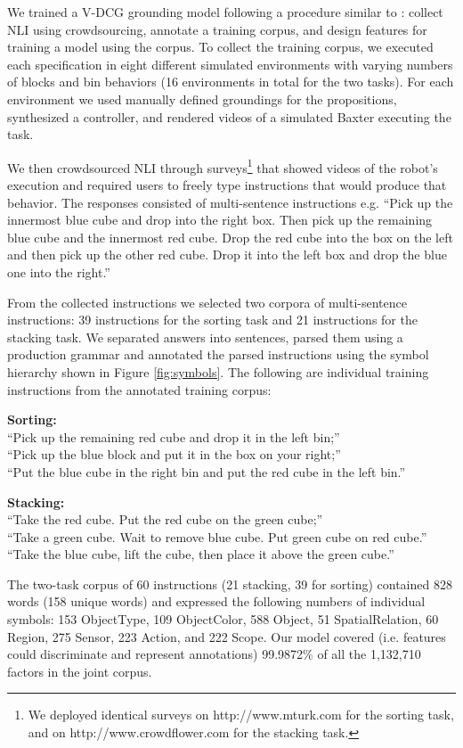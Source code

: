 \documentclass[letterpaper]{article} %
\begin{document}
We trained a V-DCG grounding model following a procedure similar to \cite{boteanu2016model}: collect NLI using crowdsourcing, annotate a training corpus, and design features for training a model using the corpus.
To collect the training corpus, we executed each specification in eight different simulated environments with varying numbers of blocks and bin behaviors (16 environments in total for the two tasks). For each environment we used manually defined groundings for the propositions, synthesized a controller, and rendered videos of a simulated Baxter executing the task.

We then crowdsourced NLI through surveys\footnote{We deployed identical surveys on http://www.mturk.com for the sorting task, and on http://www.crowdflower.com for the stacking task.}  that showed videos of the robot's execution and required users to freely type instructions that would produce that behavior. The responses consisted of multi-sentence instructions e.g. ``Pick up the innermost blue cube and drop into the right box. Then pick up the remaining blue cube and the innermost red cube. Drop the red cube into the box on the left and then pick up the other red cube. Drop it into the left box and drop the blue one into the right.''

From the collected instructions we selected two corpora of multi-sentence instructions: 39 instructions for the sorting task and 21 instructions for the stacking task.
We separated answers into sentences, parsed them using a production grammar and annotated the parsed instructions using the symbol hierarchy shown in Figure \ref{fig:symbols}.
The following are individual training instructions from the annotated training corpus:

\textbf{Sorting:}\\
``Pick up the remaining red cube and drop it in the left bin;''\\
``Pick up the blue block and put it in the box on your right;''\\
``Put the blue cube in the right bin and put the red cube in the left bin.''

\textbf{Stacking:}\\
``Take the red cube. Put the red cube on the green cube;''\\
``Take a green cube. Wait to remove blue cube. Put green cube on red cube.''\\
``Take the blue cube, lift the cube, then place it above the green cube.''

The two-task corpus of 60 instructions (21 stacking, 39 for sorting) contained 828 words (158 unique words) and expressed the following numbers of individual symbols: 153 ObjectType, 109 ObjectColor, 588 Object, 51 SpatialRelation, 60 Region, 275 Sensor, 223 Action, and 222 Scope.
Our model covered (i.e. features could discriminate and represent annotations) 99.9872\% of all the 1,132,710 factors in the joint corpus.
\end{document}
